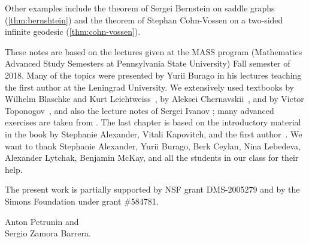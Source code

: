 Other examples include the theorem of Sergei Bernstein on saddle graphs (\ref{thm:bernshtein}) and the theorem of Stephan Cohn-Vossen
on a two-sided infinite geodesic (\ref{thm:cohn-vossen}).

These notes are based on the lectures given at the MASS program (Mathematics Advanced Study Semesters at Pennsylvania State University) Fall semester of 2018.
Many of the topics were presented by Yurii Burago in his lectures teaching the first author at the Leningrad University.
We extensively used textbooks
by Wilhelm Blaschke and Kurt Leichtweiss~\cite{blaschke-leichtweiss},
by Aleksei Chernavskii~\cite{chernavsky},
and by Victor Toponogov~\cite{toponogov-book}, and also the lecture notes of Sergei Ivanov \cite{ivanov};
many advanced exercises are taken from \cite{petrunin2020}.
The last chapter is based on the introductory material in the book by Stephanie Alexander, Vitali Kapovitch, and the first author~\cite{alexander-kapovitch-petrunin2027}.
We want to thank
Stephanie Alexander,
Yurii Burago, 
Berk Ceylan,
Nina Lebedeva,
Alexander Lytchak,
Benjamin McKay,
and all the students in our class
for their help.

The present work is partially supported by NSF grant DMS-2005279
and by the Simons Foundation under grant \#584781.

\begin{flushright}
Anton Petrunin and\\
Sergio Zamora Barrera.
\end{flushright}





